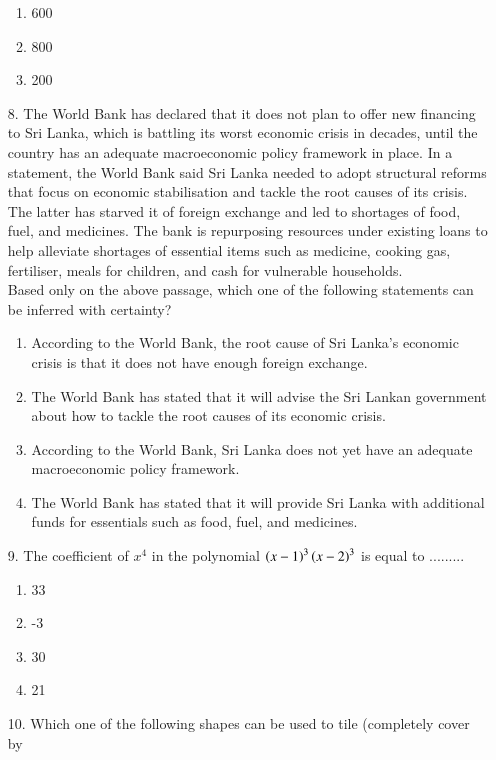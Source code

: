 \documentclass[journal]{IEEEtran}
\begin{document}
\begin{enumerate}
\begin{enumerate}[label = (\Alph*)]
        \item 600
        \item 800
        \item 200
    \end{enumerate}
    \item[8.] The World Bank has declared that it does not plan to offer new financing to Sri
    Lanka, which is battling its worst economic crisis in decades, until the country has
    an adequate macroeconomic policy framework in place. In a statement, the World
    Bank said Sri Lanka needed to adopt structural reforms that focus on economic
    stabilisation and tackle the root causes of its crisis. The latter has starved it of
    foreign exchange and led to shortages of food, fuel, and medicines. The bank is
    repurposing resources under existing loans to help alleviate shortages of essential
    items such as medicine, cooking gas, fertiliser, meals for children, and cash for
    vulnerable households.\\
    Based only on the above passage, which one of the following statements can be
    inferred with certainty?
    \begin{enumerate}[label = (\Alph*)]
        \item According to the World Bank, the root cause of Sri Lanka’s economic crisis is that
        it does not have enough foreign exchange.
        \item The World Bank has stated that it will advise the Sri Lankan government about how
        to tackle the root causes of its economic crisis.
        \item According to the World Bank, Sri Lanka does not yet have an adequate
        macroeconomic policy framework.
        \item The World Bank has stated that it will provide Sri Lanka with additional funds for
        essentials such as food, fuel, and medicines.
    \end{enumerate}
    \item[9.] The coefficient of $x^4$ in the polynomial $\left(x-1\right)^3\left(x-2\right)^3$ is equal to ......... 
    \begin{enumerate}[label = (\Alph*)]
        \item 33
        \item -3
        \item 30
        \item 21
    \end{enumerate}
    \item[10.] Which one of the following shapes can be used to tile (completely cover by

\end{enumerate}
\end{document}
